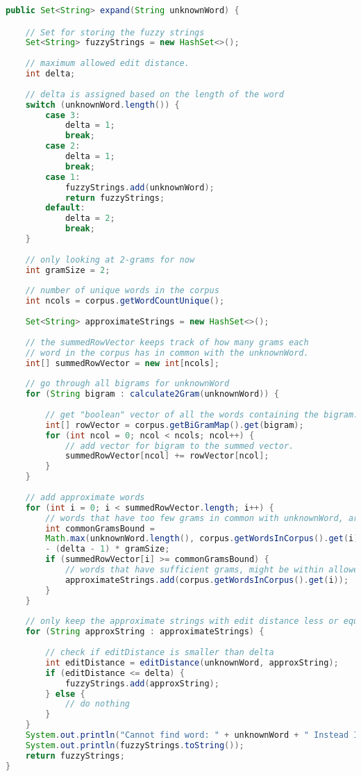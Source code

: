 \begin{lstlisting}[language={Java}, caption={Implementation of Fuzzy.expand method.}, label={lst:expand}]
public Set<String> expand(String unknownWord) {

	// Set for storing the fuzzy strings
	Set<String> fuzzyStrings = new HashSet<>();
	
	// maximum allowed edit distance.
	int delta;
	
	// delta is assigned based on the length of the word
	switch (unknownWord.length()) {
		case 3:
			delta = 1;
			break;
		case 2:
			delta = 1;
			break;
		case 1:
			fuzzyStrings.add(unknownWord);
			return fuzzyStrings;
		default:
			delta = 2;
			break;
	}
	
	// only looking at 2-grams for now
	int gramSize = 2;
	
	// number of unique words in the corpus
	int ncols = corpus.getWordCountUnique();
	
	Set<String> approximateStrings = new HashSet<>();
	
	// the summedRowVector keeps track of how many grams each 
	// word in the corpus has in common with the unknownWord.
	int[] summedRowVector = new int[ncols];
	
	// go through all bigrams for unknownWord
	for (String bigram : calculate2Gram(unknownWord)) {
	
		// get "boolean" vector of all the words containing the bigram.
		int[] rowVector = corpus.getBiGramMap().get(bigram);
		for (int ncol = 0; ncol < ncols; ncol++) {
			// add vector for bigram to the summed vector. 
			summedRowVector[ncol] += rowVector[ncol];
		}
	}
	
	// add approximate words
	for (int i = 0; i < summedRowVector.length; i++) {
		// words that have too few grams in common with unknownWord, are ignored.
		int commonGramsBound =
		Math.max(unknownWord.length(), corpus.getWordsInCorpus().get(i).length()) - 1
		- (delta - 1) * gramSize;
		if (summedRowVector[i] >= commonGramsBound) {
			// words that have sufficient grams, might be within allowed edit distance. 
			approximateStrings.add(corpus.getWordsInCorpus().get(i));
		}
	}
	
	// only keep the approximate strings with edit distance less or equal to allowed.
	for (String approxString : approximateStrings) {
	
		// check if editDistance is smaller than delta
		int editDistance = editDistance(unknownWord, approxString);
		if (editDistance <= delta) {
			fuzzyStrings.add(approxString);
		} else {
			// do nothing
		}
	}
	System.out.println("Cannot find word: " + unknownWord + " Instead I'll try to search for:");
	System.out.println(fuzzyStrings.toString());
	return fuzzyStrings;
}
\end{lstlisting}


